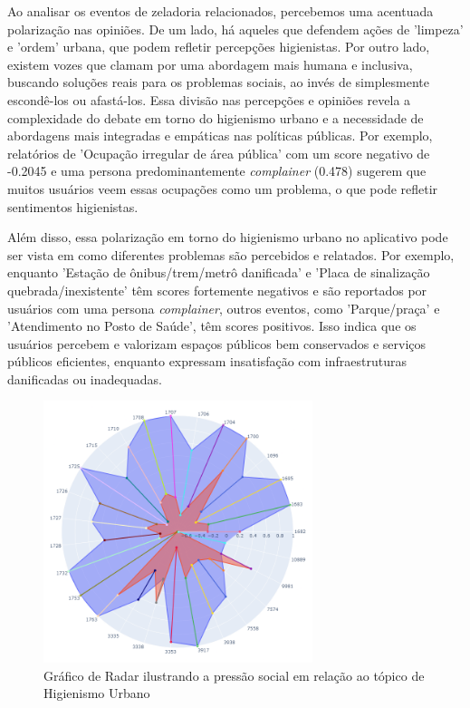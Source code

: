 Ao analisar os eventos de zeladoria relacionados, percebemos uma acentuada polarização nas opiniões. De um lado, há aqueles que defendem ações de 'limpeza' e 'ordem' urbana, que podem refletir percepções higienistas. Por outro lado, existem vozes que clamam por uma abordagem mais humana e inclusiva, buscando soluções reais para os problemas sociais, ao invés de simplesmente escondê-los ou afastá-los. Essa divisão nas percepções e opiniões revela a complexidade do debate em torno do higienismo urbano e a necessidade de abordagens mais integradas e empáticas nas políticas públicas. Por exemplo, relatórios de 'Ocupação irregular de área pública' com um score negativo de -0.2045 e uma persona predominantemente \textit{complainer} (0.478) sugerem que muitos usuários veem essas ocupações como um problema, o que pode refletir sentimentos higienistas.

Além disso, essa polarização em torno do higienismo urbano no aplicativo pode ser vista em como diferentes problemas são percebidos e relatados. Por exemplo, enquanto 'Estação de ônibus/trem/metrô danificada' e 'Placa de sinalização quebrada/inexistente' têm scores fortemente negativos e são reportados por usuários com uma persona \textit{complainer}, outros eventos, como 'Parque/praça' e 'Atendimento no Posto de Saúde', têm scores positivos. Isso indica que os usuários percebem e valorizam espaços públicos bem conservados e serviços públicos eficientes, enquanto expressam insatisfação com infraestruturas danificadas ou inadequadas.

\begin{figure}[htb]
	\centering
	\includegraphics[width=0.7\textwidth]{images/social_barometer_homeland.png}
	\caption{Gráfico de Radar ilustrando a pressão social em relação ao tópico de Higienismo Urbano}
	\label{fig:social_barometer_homeland}
\end{figure}

